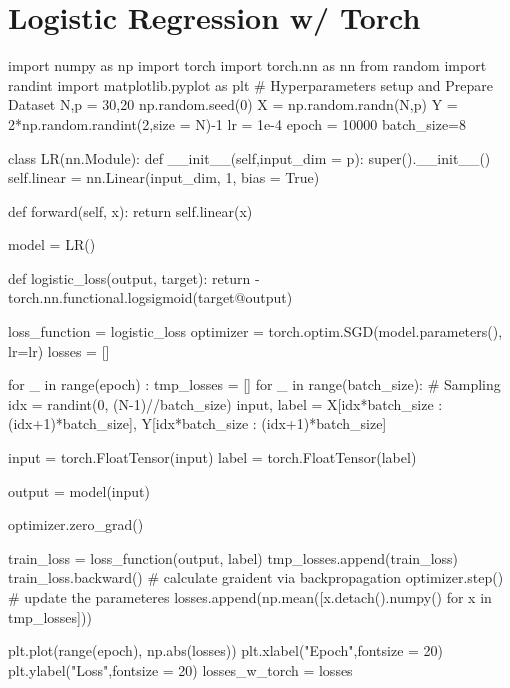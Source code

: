 \documentclass[10pt]{article}
\begin{document}
\clearpage
\appendix
\section{Logistic Regression w/ Torch}
\begin{python}
import numpy as np
import torch
import torch.nn as nn
from random import randint
import matplotlib.pyplot as plt
# Hyperparameters setup and Prepare Dataset
N,p = 30,20
np.random.seed(0)
X = np.random.randn(N,p)
Y = 2*np.random.randint(2,size = N)-1
lr = 1e-4
epoch = 10000
batch_size=8

class LR(nn.Module):
    def __init__(self,input_dim = p):
        super().__init__()
        self.linear = nn.Linear(input_dim, 1, bias = True)
    
    def forward(self, x):
        return self.linear(x)

model = LR()

def logistic_loss(output, target):
    return -torch.nn.functional.logsigmoid(target@output)

loss_function = logistic_loss                                                   
optimizer = torch.optim.SGD(model.parameters(), lr=lr) 
losses = []


for _ in range(epoch) :
    tmp_losses = []
    for _ in range(batch_size):
        # Sampling
        idx = randint(0, (N-1)//batch_size)
        input, label = X[idx*batch_size : (idx+1)*batch_size], Y[idx*batch_size : (idx+1)*batch_size]
        
        input = torch.FloatTensor(input)
        label = torch.FloatTensor(label)
        
        output = model(input)

        optimizer.zero_grad()

        train_loss = loss_function(output, label)
        tmp_losses.append(train_loss)
        train_loss.backward() # calculate graident via backpropagation
        optimizer.step() # update the parameteres
    losses.append(np.mean([x.detach().numpy() for x in tmp_losses]))

plt.plot(range(epoch), np.abs(losses))
plt.xlabel("Epoch",fontsize = 20)
plt.ylabel("Loss",fontsize = 20)
losses_w_torch = losses
\end{python}
\end{document}
